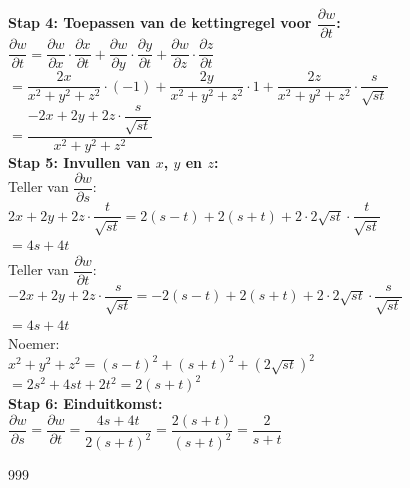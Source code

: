 \documentclass[a4paper]{article}
\begin{document}
\textbf{Stap 4: Toepassen van de kettingregel voor $\dfrac{\partial w}{\partial t}$:}\\

$\dfrac{\partial w}{\partial t} = \dfrac{\partial w}{\partial x} \cdot \dfrac{\partial x}{\partial t} + \dfrac{\partial w}{\partial y} \cdot \dfrac{\partial y}{\partial t} + \dfrac{\partial w}{\partial z} \cdot \dfrac{\partial z}{\partial t}$\\

$= \dfrac{2x}{x^2 + y^2 + z^2} \cdot (-1) + \dfrac{2y}{x^2 + y^2 + z^2} \cdot 1 + \dfrac{2z}{x^2 + y^2 + z^2} \cdot \dfrac{s}{\sqrt{st}}$\\

$= \dfrac{-2x + 2y + 2z \cdot \dfrac{s}{\sqrt{st}}}{x^2 + y^2 + z^2}$\\


\textbf{Stap 5: Invullen van $x$, $y$ en $z$:}\\

Teller van $\dfrac{\partial w}{\partial s}$:\\

$2x+2y+2z \cdot \dfrac{t}{\sqrt{st}} = 2 (s-t) + 2(s+t) + 2 \cdot 2 \sqrt{st} \cdot \dfrac{t}{\sqrt{st}}$ \\

$= 4s + 4t$ \\

Teller van $\dfrac{\partial w}{\partial t}$:\\

$-2x+2y+2z \cdot \dfrac{s}{\sqrt{st}} = -2 (s-t) + 2(s+t) + 2 \cdot 2 \sqrt{st} \cdot \dfrac{s}{\sqrt{st}}$ \\

$= 4s + 4t$ \\


Noemer:\\

$x^2 + y^2 + z^2 = (s-t)^2 + (s+t)^2 + (2\sqrt{st})^2$ \\

$= 2s^2 + 4st + 2t^2 = 2 (s+t)^2$ \\

\textbf{Stap 6: Einduitkomst:}\\

$\dfrac{\partial w}{\partial s} = \dfrac{\partial w}{\partial t} = \dfrac{4s + 4t}{2 (s+t)^2} =  \dfrac{2(s + t)}{(s+t)^2} = \dfrac{2}{s + t}$\\
 

\begin{thebibliography}{999}
\end{thebibliography}
\end{document}
